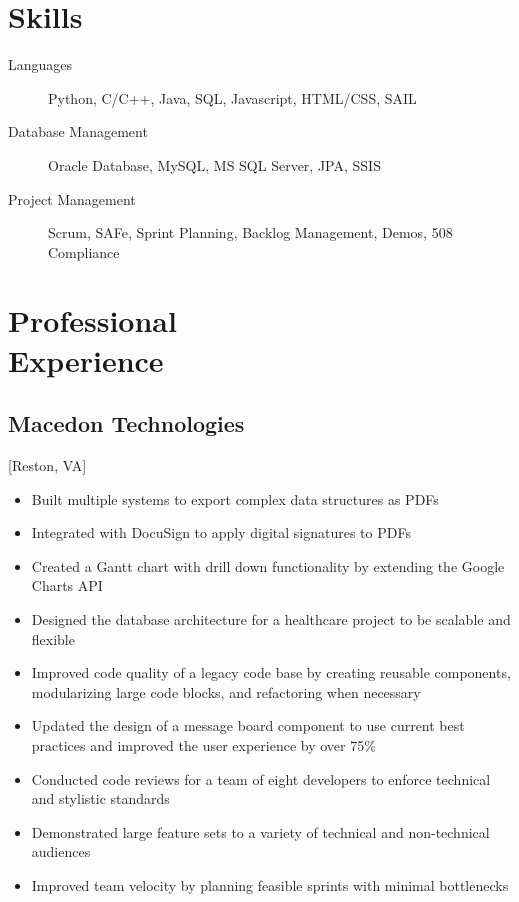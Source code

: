 \documentclass{mycv}
\begin{document}
\maketitle%

\section{Skills}

\begin{description}
  \item[Languages] Python, C/C++, Java, SQL, Javascript, HTML/CSS, SAIL
  \item[Database Management] Oracle Database, MySQL, MS SQL Server, JPA, SSIS
  \item[Project Management] Scrum, SAFe, Sprint Planning, Backlog Management, Demos, 508 \\ Compliance
\end{description}

\section{Professional \\ Experience}

\subsection{Macedon Technologies}[Reston, VA]
\begin{positions}
\end{positions}

\begin{itemize}
  \item Built multiple systems to export complex data structures as PDFs
  \item Integrated with DocuSign to apply digital signatures to PDFs
  \item Created a Gantt chart with drill down functionality by extending the Google Charts API
  \item Designed the database architecture for a healthcare project to be scalable and flexible
  \item Improved code quality of a legacy code base by creating reusable components, modularizing large code blocks, and refactoring when necessary
  \item Updated the design of a message board component to use current best practices and improved the user experience by over 75\%
  \item Conducted code reviews for a team of eight developers to enforce technical and stylistic standards
  \item Demonstrated large feature sets to a variety of technical and non-technical audiences
  \item Improved team velocity by planning feasible sprints with minimal bottlenecks
\end{itemize}
\end{document}
